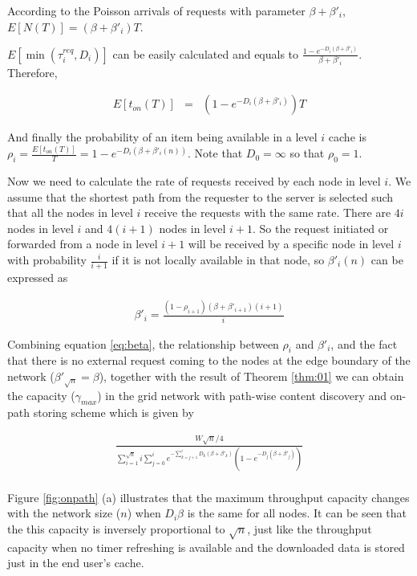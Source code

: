 \documentclass[journal]{IEEEtran}
\theoremstyle{plain}
\theoremstyle{remark}
\begin{document}
According to the Poisson arrivals of requests with parameter $\beta+\beta'_i$, $E[N(T)]=(\beta+\beta'_i)T$. 

$E[\min(\tau_i^{req},D_i)]$ can be easily calculated and equals to $\frac{1-e^{-D_i(\beta+\beta'_i)}}{\beta+\beta'_i}$. Therefore,

\begin{eqnarray}
E[t_{on}(T)]&=&(1-e^{-D_i(\beta+\beta'_i)})T
\end{eqnarray}
 
And finally the probability of an item being available in a level $i$ cache is $\rho_i=\frac{E[t_{on}(T)]}{T}=1-e^{-D_i(\beta+\beta'_i(n))}$. 
Note that $D_0=\infty$ so that $\rho_0=1$.

Now we need to calculate the rate of requests received by each node in level $i$. We assume that the shortest path from the requester to the server is selected such that all the nodes in level $i$ receive the requests with the same rate. There are $4i$ nodes in level $i$ and $4(i+1)$ nodes in level $i+1$. So the request initiated or forwarded from a node in level $i+1$ will be received by a specific node in level $i$ with probability $\frac{i}{i+1}$ if it is not locally available in that node, so $\beta'_i(n)$ can be expressed as

\begin{eqnarray}
\beta'_i=\frac{(1-\rho_{i+1})(\beta+\beta'_{i+1})(i+1)}{i}  \label{eq:beta}
\end{eqnarray} 

Combining equation \ref{eq:beta}, the relationship between $\rho_i$ and $\beta'_i$, and the fact that there is no external request coming to the nodes at the edge boundary of the network ($\beta'_{\sqrt{n}}=\beta$), together with the result of Theorem \ref{thm:01} we can obtain the capacity ($\gamma_{max}$) in the grid network with path-wise content discovery and on-path storing scheme which is given by

\begin{eqnarray}
\frac{W\sqrt{n}/4}{\sum_{i=1}^{\sqrt{n}}i\sum_{j=0}^i e^{-\sum_{k=j+1}^i D_k(\beta+\beta'_k)}(1-e^{-D_j(\beta+\beta'_j)})} \nonumber \\
\end{eqnarray}  

Figure \ref{fig:onpath} (a) illustrates that the maximum throughput capacity changes with the network size ($n$) when $D_i\beta$ is the same for all nodes. It can be seen that the this capacity is inversely proportional to $\sqrt{n}$, just like the throughput capacity when no timer refreshing is available and the downloaded data is stored just in the end user's cache. 
\end{document}
